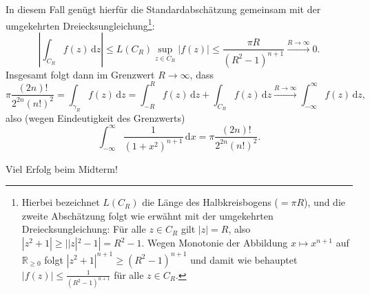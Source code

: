 \documentclass{article}
\theoremstyle{plain}
\theoremstyle{definition}
\begin{document}
\begin{enumerate}
	      In diesem Fall genügt hierfür die Standardabschätzung gemeinsam mit der umgekehrten Dreiecksungleichung\footnote{
	      Hierbei bezeichnet $L(C_R)$ die Länge des Halbkreisbogens ($= \pi R$), und die zweite Abschätzung folgt wie erwähnt mit der umgekehrten Dreiecksungleichung: Für alle $z \in C_R$ gilt $|z| = R$, also $|z^2 + 1| \ge ||z|^2 - 1| = R^2 - 1$.
	      Wegen Monotonie der Abbildung $x \mapsto x^{n + 1}$ auf $\mathbb{R}_{\ge 0}$ folgt $|z^2 + 1|^{n + 1} \ge (R^2 - 1)^{n + 1}$ und damit wie behauptet $|f(z)| \le \frac{1}{(R^2 - 1)^{n + 1}}$ für alle $z \in C_R$.
	      }:
	      \[
		      \left| \int_{C_R} f(z) \,\mathrm{d}z \right| \le L(C_R) \sup_{z \in C_R} |f(z)| \le \frac{\pi R}{(R^2 - 1)^{n + 1}} \overset{R \to \infty}{\longrightarrow} 0.
	      \]
	      Insgesamt folgt dann im Grenzwert $R \to \infty$, dass
	      \[
		      \pi \frac{(2 n)!}{2^{2 n} (n!)^2} = \int_{\gamma_R} f(z) \,\mathrm{d}z = \int_{-R}^{R} f(z) \,\mathrm{d}z + \int_{C_R} f(z) \,\mathrm{d}z \overset{R \to \infty}{\longrightarrow} \int_{-\infty}^{\infty} f(z) \,\mathrm{d}z,
	      \]
	      also (wegen Eindeutigkeit des Grenzwerts)
	      \[
		      \int_{-\infty}^{\infty} \frac{1}{(1 + x^2)^{n + 1}} \,\mathrm{d}x = \pi \frac{(2 n)!}{2^{2 n} (n!)^2}.
	      \]
\end{enumerate}
Viel Erfolg beim Midterm! \faSmile[regular]
\end{document}
